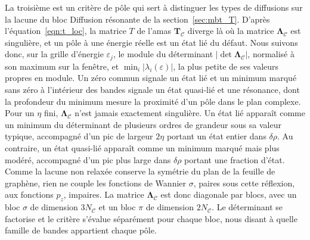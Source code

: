 La troisième est un critère de pôle qui sert à distinguer les types de diffusions sur la lacune du bloc \og Diffusion résonante \fg{} de la section~\ref{sec:mbt_T}. D'après l'équation~\eqref{eqn:t_loc}, la matrice $T$ de l'amas $\bm T_\mathcal{C}$ diverge là où la matrice $\bm\Lambda_\mathcal{C}$ est singulière, et un pôle à une énergie réelle est un état lié du défaut. Nous suivons donc, sur la grille d'énergie $\varepsilon_j$, le module du déterminant $|\det\bm\Lambda_\mathcal{C}|$, normalisé à son maximum sur la fenêtre, et $\min_i|\lambda_i(\varepsilon)|$, la plus petite de ses valeurs propres en module. Un zéro commun signale un état lié et un minimum marqué sans zéro à l'intérieur des bandes signale un état quasi-lié et une résonance, dont la profondeur du minimum mesure la proximité d'un pôle dans le plan complexe. Pour un $\eta$ fini, $\bm\Lambda_\mathcal{C}$ n'est jamais exactement singulière. Un état lié apparaît comme un minimum du déterminant de plusieurs ordres de grandeur sous sa valeur typique, accompagné d'un pic de largeur $2\eta$ portant un état entier dans $\delta\rho$. Au contraire, un état quasi-lié apparaît comme un minimum marqué mais plus modéré, accompagné d'un pic plus large dans $\delta\rho$ portant une fraction d'état. Comme la lacune non relaxée conserve la symétrie du plan de la feuille de graphène, rien ne couple les fonctions de Wannier $\sigma$, paires sous cette réflexion, aux fonctions $p_z$, impaires. La matrice $\bm\Lambda_\mathcal{C}$ est donc diagonale par blocs, avec un bloc $\sigma$ de dimension $3N_\mathcal{C}$ et un bloc $\pi$ de dimension $2N_\mathcal{C}$. Le déterminant se factorise et le critère s'évalue séparément pour chaque bloc, nous disant à quelle famille de bandes appartient chaque pôle.

\bigskip
{}

